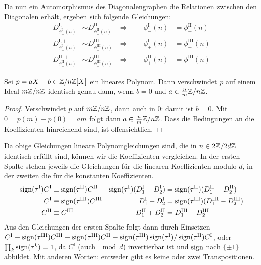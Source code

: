 Da nun ein Automorphismus des Diagonalengraphen die Relationen zwischen den Diagonalen erhält, ergeben sich folgende Gleichungen:
\begin{align*}
D_{\phi_-^\mathrm{I}(n)}^{\mathrm{I},-} &\sim D_{\phi_-^\mathrm{II}(n)}^{\mathrm{II},-}
	&\Longrightarrow\qquad \phi_-^\mathrm{I}(n) &= \phi_-^\mathrm{II}(n) \\
D_{\phi_+^\mathrm{I}(n)}^{\mathrm{I},+} &\sim D_{\phi_-^\mathrm{III}(n)}^{\mathrm{III},-}
	&\Longrightarrow\qquad \phi_+^\mathrm{I}(n) &= \phi_-^\mathrm{III}(n) \\
D_{\phi_+^\mathrm{II}(n)}^{\mathrm{II},+} &\sim D_{\phi_+^\mathrm{III}(n)}^{\mathrm{III},+}
	&\Longrightarrow\qquad \phi_+^\mathrm{II}(n) &= \phi_+^\mathrm{III}(n)
\end{align*}
\begin{prop}
Sei $p = aX+b \in \Zmod nZ[X]$ ein lineares Polynom. Dann verschwindet $p$ auf einem Ideal $m\Zmod nZ$ identisch genau dann, wenn $b=0$ und $a \in \frac n m \Zmod nZ$.
\end{prop}
\begin{proof}
Verschwindet $p$ auf $m\Zmod nZ$, dann auch in $0$: damit ist $b=0$. Mit $0 = p(m) - p(0) = am$ folgt dann $a \in \frac n m \Zmod nZ$. Dass die Bedingungen an die Koeffizienten hinreichend sind, ist offensichtlich.
\end{proof}
Da obige Gleichungen lineare Polynomgleichungen sind, die in $n \in 2\Zmod 2dZ$ identisch erfüllt sind, können wir die Koeffizienten vergleichen. In der ersten Spalte stehen jeweils die Gleichungen für die linearen Koeffizienten modulo $d$, in der zweiten die für die konstanten Koeffizienten.
\begin{align*}
\operatorname{sign}(\tau^\mathrm{I}) C^\mathrm{I} &\equiv \operatorname{sign}(\tau^\mathrm{II}) C^\mathrm{II}
& \operatorname{sign}(\tau^\mathrm{I}) (D_1^\mathrm{I} - D_2^\mathrm{I}) &= \operatorname{sign}(\tau^\mathrm{II}) (D_1^\mathrm{II} - D_2^\mathrm{II}) \\
C^\mathrm{I} &\equiv \operatorname{sign}(\tau^\mathrm{III}) C^\mathrm{III}
& D_1^\mathrm{I} + D_2^\mathrm{I} &= \operatorname{sign}(\tau^\mathrm{III}) (D_1^\mathrm{III} - D_2^\mathrm{III}) \\
C^\mathrm{II} &\equiv C^\mathrm{III}
& D_1^\mathrm{II} + D_2^\mathrm{II} &= D_1^\mathrm{III} + D_2^\mathrm{III}
\end{align*}
Aus den Gleichungen der ersten Spalte folgt dann durch Einsetzen $C^\mathrm{I} \equiv \operatorname{sign}(\tau^\mathrm{III}) C^\mathrm{III} \equiv \operatorname{sign}(\tau^\mathrm{III}) C^\mathrm{II} \equiv \operatorname{sign}(\tau^\mathrm{III})\operatorname{sign}(\tau^\mathrm{I}) / \operatorname{sign}(\tau^\mathrm{II}) C^\mathrm{I}$, oder $\prod_k \operatorname{sign}(\tau^k) = 1$, da $C^\mathrm{I}$ (auch $\mod d$) invertierbar ist und $\operatorname{sign}$ nach $\{\pm 1\}$ abbildet. Mit anderen Worten: entweder gibt es keine oder zwei Transpositionen.

